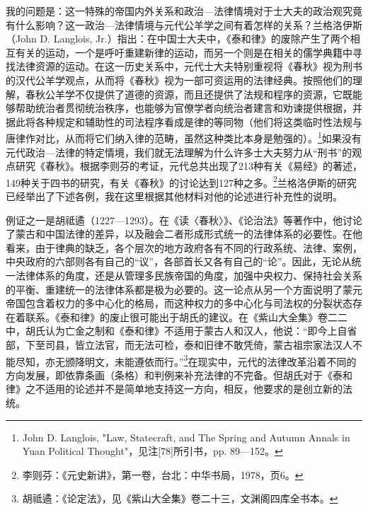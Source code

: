 \documentclass[a4paper, 12pt, openright]{ctexbook}
\begin{document}
我的问题是：这一特殊的帝国内外关系和政治—法律情境对于士大夫的政治观究竟有什么影响？这一政治—法律情境与元代公羊学之间有着怎样的关系？兰格洛伊斯（John D. Langlois, Jr.）指出：在中国士大夫中，《泰和律》的废除产生了两个相互有关的运动，一个是呼吁重建新律的运动，而另一个则是在相关的儒学典籍中寻找法律资源的运动。在这一历史关系中，元代士大夫特别重视将《春秋》视为刑书的汉代公羊学观点，从而将《春秋》视为一部可资运用的法律经典。按照他们的理解，春秋公羊学不仅提供了道德的资源，而且还提供了法规和程序的资源，它既能够帮助统治者贯彻统治秩序，也能够为官僚学者向统治者建言和劝谏提供根据，并据此将各种规定和辅助性的司法程序看成是律的等同物（他们将这类临时性法规与唐律作对比，从而将它们纳入律的范畴，虽然这种类比本身是勉强的）。\footnote{John D. Langlois, "Law, Statecraft, and The Spring and Autumn Annals in Yuan Political Thought"，见注[78]所引书，pp. 89—152。}如果没有元代政治—法律的特定情境，我们就无法理解为什么许多士大夫努力从“刑书”的观点研究《春秋》。根据李则芬的考证，元代总共出现了213种有关《易经》的著述，149种关于四书的研究，有关《春秋》的讨论达到127种之多。\footnote{李则芬：《元史新讲》，第一卷，台北：中华书局，1978，页6。}兰格洛伊斯的研究已经举出了下述各例，我在这里根据其他材料对他的论述进行补充性的说明。

例证之一是胡祗遹（1227—1293）。在《读〈春秋〉》、《论治法》等著作中，他讨论了蒙古和中国法律的差异，以及融会二者形成形式统一的法律体系的必要性。在他看来，由于律典的缺乏，各个层次的地方政府各有不同的行政系统、法律、案例，中央政府的六部则各有自己的“议”，各部首长又各有自己的“论”。因此，无论从统一法律体系的角度，还是从管理多民族帝国的角度，加强中央权力、保持社会关系的平衡、重建统一的法律体系都是极为必要的。这一论点从另一个方面说明了蒙元帝国包含着权力的多中心化的格局，而这种权力的多中心化与司法权的分裂状态存在着联系。《泰和律》的废止很可能出于胡氏的建议。在《紫山大全集》卷二二中，胡氏认为亡金之制和《泰和律》不适用于蒙古人和汉人，他说：“即今上自省部，下至司县，皆立法官，而无法可检，泰和旧律不敢凭倚，蒙古祖宗家法汉人不能尽知，亦无颁降明文，未能遵依而行。”\footnote{胡祗遹：《论定法》，见《紫山大全集》卷二十三，文渊阁四库全书本。}在现实中，元代的法律改革沿着不同的方向发展，即依靠条画（条格）和判例来补充法律的不完备。但胡氏对于《泰和律》之不适用的论述并不是简单地支持这一方向，相反，他要求的是创立新的法统。
\end{document}
